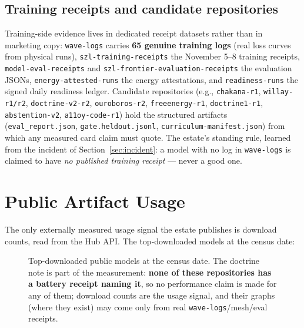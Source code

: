 ﻿\documentclass[11pt]{article}
\begin{document}
\subsection{Training receipts and candidate repositories}
Training-side evidence lives in dedicated receipt datasets rather than in marketing copy: \texttt{wave-logs} carries \textbf{65 genuine training logs} (real loss curves from physical runs), \texttt{szl-training-receipts} the November 5--8 training receipts, \texttt{model-eval-receipts} and \texttt{szl-frontier-evaluation-receipts} the evaluation JSONs, \texttt{energy-attested-runs} the energy attestations, and \texttt{readiness-runs} the signed daily readiness ledger. Candidate repositories (e.g., \texttt{chakana-r1}, \texttt{willay-r1/r2}, \texttt{doctrine-v2-r2}, \texttt{ouroboros-r2}, \texttt{freeenergy-r1}, \texttt{doctrine1-r1}, \texttt{abstention-v2}, \texttt{a11oy-code-r1}) hold the structured artifacts (\texttt{eval\_report.json}, \texttt{gate.heldout.jsonl}, \texttt{curriculum-manifest.json}) from which any measured card claim must quote. The estate's standing rule, learned from the incident of Section~\ref{sec:incident}: a model with no log in \texttt{wave-logs} is claimed to have \emph{no published training receipt} --- never a good one.

\section{Public Artifact Usage}
\label{sec:usage}

The only externally measured usage signal the estate publishes is download counts, read from the Hub API. The top-downloaded models at the census date:

\begin{figure}[htbp]
\centering
{}
\caption{Top-downloaded public models at the census date. The doctrine note is part of the measurement: \textbf{none of these repositories has a battery receipt naming it}, so no performance claim is made for any of them; download counts are the usage signal, and their graphs (where they exist) may come only from real \texttt{wave-logs}/mesh/eval receipts.}
\label{fig:downloads}
\end{figure}
\end{document}
